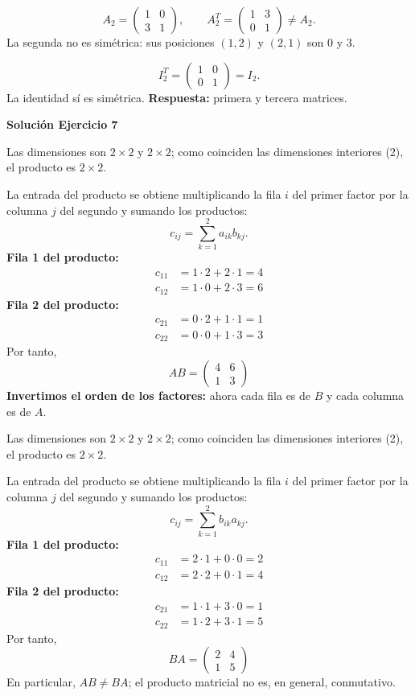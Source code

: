 \documentclass[12pt]{article}
\begin{document}
\[
A_2=\begin{pmatrix}1&0\\3&1\end{pmatrix},\qquad A_2^T=\begin{pmatrix}1&3\\0&1\end{pmatrix}\ne A_2.
\]
La segunda no es simétrica: sus posiciones $(1,2)$ y $(2,1)$ son $0$ y $3$.

\[
I_2^T=\begin{pmatrix}1&0\\0&1\end{pmatrix}=I_2.
\]
La identidad sí es simétrica. \textbf{Respuesta:} primera y tercera matrices.


\par\bigskip\noindent\textbf{Solución Ejercicio 7}\par\nobreak
Las dimensiones son $2\times2$ y $2\times2$; como coinciden las dimensiones interiores (2), el producto es $2\times2$.

La entrada del producto se obtiene multiplicando la fila $i$ del primer factor por la columna $j$ del segundo y sumando los productos:
\[
c_{ij}=\sum_{k=1}^{2} a_{ik}b_{kj}.
\]
\textbf{Fila 1 del producto:}
\[
\begin{aligned}c_{11}&=1\cdot 2+2\cdot 1=4\\c_{12}&=1\cdot 0+2\cdot 3=6\end{aligned}
\]
\textbf{Fila 2 del producto:}
\[
\begin{aligned}c_{21}&=0\cdot 2+1\cdot 1=1\\c_{22}&=0\cdot 0+1\cdot 3=3\end{aligned}
\]
Por tanto,
\[
\boxed{AB=\begin{pmatrix}4&6\\1&3\end{pmatrix}}
\]
\textbf{Invertimos el orden de los factores:} ahora cada fila es de $B$ y cada columna es de $A$.

Las dimensiones son $2\times2$ y $2\times2$; como coinciden las dimensiones interiores (2), el producto es $2\times2$.

La entrada del producto se obtiene multiplicando la fila $i$ del primer factor por la columna $j$ del segundo y sumando los productos:
\[
c_{ij}=\sum_{k=1}^{2} b_{ik}a_{kj}.
\]
\textbf{Fila 1 del producto:}
\[
\begin{aligned}c_{11}&=2\cdot 1+0\cdot 0=2\\c_{12}&=2\cdot 2+0\cdot 1=4\end{aligned}
\]
\textbf{Fila 2 del producto:}
\[
\begin{aligned}c_{21}&=1\cdot 1+3\cdot 0=1\\c_{22}&=1\cdot 2+3\cdot 1=5\end{aligned}
\]
Por tanto,
\[
\boxed{BA=\begin{pmatrix}2&4\\1&5\end{pmatrix}}
\]
En particular, $AB\ne BA$; el producto matricial no es, en general, conmutativo.
\end{document}
